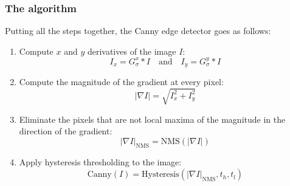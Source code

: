 \subsubsection{The algorithm}
Putting all the steps together, the Canny edge detector goes as follows:
\begin{enumerate}
    \item Compute $x$ and $y$ derivatives of the image $I$:
    \begin{equation*}
        I_x = G^x_\sigma * I \quad \text{and} \quad I_y = G^y_\sigma * I
    \end{equation*}
    \item Compute the magnitude of the gradient at every pixel:
    \begin{equation*}
        |\nabla I| = \sqrt{I_x^2 + I_y^2}
    \end{equation*}
    \item Eliminate the pixels that are not local maxima of the magnitude in the direction of the gradient:
    \begin{equation*}
        |\nabla I|_{\text{NMS}} = \text{NMS}(|\nabla I|)
    \end{equation*}
    \item Apply hysteresis thresholding to the image:
    \begin{equation*}
        \text{Canny}(I) = \text{Hysteresis}(|\nabla I|_{\text{NMS}}, t_h, t_l)
    \end{equation*}
\end{enumerate}
